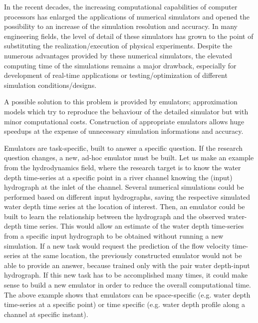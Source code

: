 
In the recent decades, the increasing computational capabilities of computer processors has enlarged the applications of numerical simulators and opened the possibility to an increase of the simulation resolution and accuracy. In many engineering fields, the level of detail of these simulators has grown to the point of substituting the realization/execution of physical experiments. 
Despite the numerous advantages provided by these numerical simulators, the elevated computing time of the simulations remains a major drawback, especially for development of real-time applications or testing/optimization of different simulation conditions/designs.  
 
A possible solution to this problem is provided by emulators; approximation models which try to reproduce the behaviour of the detailed simulator but with minor computational costs. Construction of appropriate emulators allows huge speedups at the expense of unnecessary simulation informations and accuracy\autocite{carbajal_appraisal_2016}.

Emulators are task-specific, built to answer a specific question.
If the research question changes, a new, ad-hoc emulator must be built.
Let us make an example from the hydrodynamics field, where the research target is to know the water depth time-series at a specific point in a river channel knowing the (input) hydrograph at the inlet of the channel. 
Several numerical simulations could be performed based on different input hydrographs, saving the respective simulated water depth time series at the location of interest. Then, an emulator could be built to learn the relationship between the hydrograph and the observed water-depth time series. 
This would allow an estimate of the water depth time-series from a specific input
hydrograph to be obtained without running a new simulation.
If a new task would request the prediction of the flow velocity time-series at the same location, the previously constructed emulator would not be able to provide an answer, because trained only with the pair water depth-input hydrograph. If this new task has to be accomplished many times, it could make sense to build a new emulator in order to reduce the overall computational time.
The above example shows that emulators can be space-specific (e.g. water depth time-series at a specific point) or time specific (e.g. water depth profile along a channel at specific instant).\\

